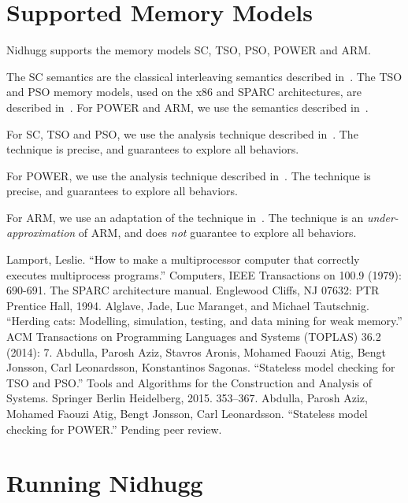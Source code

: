 \documentclass[a4paper]{article}
\begin{document}
\section{Supported Memory Models}

Nidhugg supports the memory models SC, TSO, PSO, POWER and ARM.

The SC semantics are the classical interleaving semantics described
in~\cite{lamport1979make}. The TSO and PSO memory models, used on the
x86 and SPARC architectures, are described in~\cite{sparcv9}. For
POWER and ARM, we use the semantics described in~\cite{alglaveHerding}.

For SC, TSO and PSO, we use the analysis technique described
in~\cite{leonardssonSMCTSO}. The technique is precise, and guarantees
to explore all behaviors.

For POWER, we use the analysis technique described
in~\cite{leonardssonRSMCPOWER}. The technique is precise, and
guarantees to explore all behaviors.

For ARM, we use an adaptation of the technique
in~\cite{leonardssonRSMCPOWER}. The technique is an
\emph{under-approximation} of ARM, and does \emph{not} guarantee to
explore all behaviors.

\begin{thebibliography}{99}
  Lamport, Leslie. ``How to make a multiprocessor computer that correctly executes multiprocess programs.'' Computers, IEEE Transactions on 100.9 (1979): 690-691.
  The SPARC architecture manual. Englewood Cliffs, NJ 07632: PTR Prentice Hall, 1994.
  Alglave, Jade, Luc Maranget, and Michael Tautschnig. ``Herding cats: Modelling, simulation, testing, and data mining for weak memory.'' ACM Transactions on Programming Languages and Systems (TOPLAS) 36.2 (2014): 7.
  Abdulla, Parosh Aziz, Stavros Aronis, Mohamed Faouzi Atig, Bengt Jonsson, Carl Leonardsson, Konstantinos Sagonas. ``Stateless model checking for TSO and PSO.'' Tools and Algorithms for the Construction and Analysis of Systems. Springer Berlin Heidelberg, 2015. 353--367.
  Abdulla, Parosh Aziz, Mohamed Faouzi Atig, Bengt Jonsson, Carl Leonardsson. ``Stateless model checking for POWER.'' Pending peer review.
\end{thebibliography}

\section{Running Nidhugg}
\end{document}
